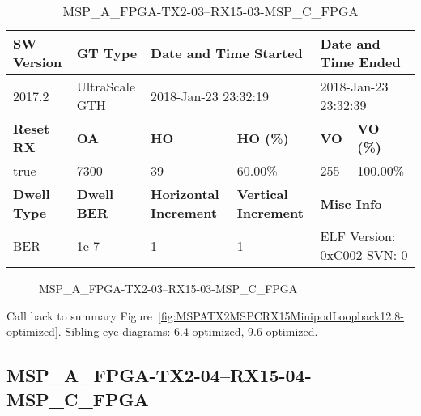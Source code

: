 \begin{table}[h]
\centering
\caption{MSP\_A\_FPGA-TX2-03--RX15-03-MSP\_C\_FPGA}
\label{tab:MSPAFPGATX203RX1503MSPCFPGA12.8-optimized}
\begin{tabular}{@{}|l|l|l|l|l|l|@{}}
\toprule
\textbf{SW Version}                & \textbf{GT Type}   & \multicolumn{2}{l|}{\textbf{Date and Time Started}}            & \multicolumn{2}{l|}{\textbf{Date and Time Ended}}        \\ \midrule
2017.2                       & UltraScale GTH          & \multicolumn{2}{l|}{2018-Jan-23 23:32:19}                   & \multicolumn{2}{l|}{2018-Jan-23 23:32:39}               \\ \midrule
\textbf{Reset RX}                  & \textbf{OA} & \textbf{HO}   & \textbf{HO (\%)} & \textbf{VO} & \textbf{VO (\%)} \\ \midrule
true & 7300        & 39          & 60.00\%        & 255        & 100.00\%       \\ \midrule
\textbf{Dwell Type}                & \textbf{Dwell BER} & \textbf{Horizontal Increment} & \textbf{Vertical Increment}    & \multicolumn{2}{l|}{\textbf{Misc Info}}                  \\ \midrule
BER                            & 1e-7        & 1        & 1           & \multicolumn{2}{l|}{ELF Version: 0xC002 SVN: 0}                         \\ \bottomrule
\end{tabular}
\end{table}

\begin{figure}[h]
\caption{MSP\_A\_FPGA-TX2-03--RX15-03-MSP\_C\_FPGA} \label{fig:MSPAFPGATX203RX1503MSPCFPGA12.8-optimized}
\end{figure}

Call back to summary Figure~\ref{fig:MSPATX2MSPCRX15MinipodLoopback12.8-optimized}.
Sibling eye diagrams: \hyperref[sec:MSPAFPGATX203RX1503MSPCFPGA6.4-optimized]{6.4-optimized}, \hyperref[sec:MSPAFPGATX203RX1503MSPCFPGA9.6-optimized]{9.6-optimized}.

\clearpage
\newpage


\subsection{MSP\_A\_FPGA-TX2-04--RX15-04-MSP\_C\_FPGA}\label{sec:MSPAFPGATX204RX1504MSPCFPGA12.8-optimized}

